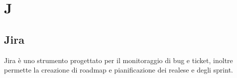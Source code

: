 \section{J}

\subsection{Jira}
Jira è uno strumento progettato per il monitoraggio di bug e ticket, inoltre permette la creazione di roadmap e pianificazione dei realese e degli sprint.
\clearpage